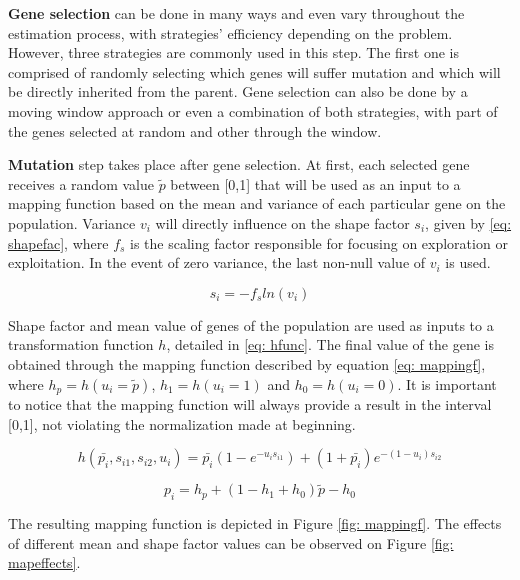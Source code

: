 \textbf{Gene selection} can be done in many ways and even vary throughout the estimation process, with strategies' efficiency depending on the problem. However, three strategies are commonly used in this step. The first one is comprised of randomly selecting which genes will suffer mutation and which will be directly inherited from the parent. Gene selection can also be done by a moving window approach or even a combination of both strategies, with part of the genes selected at random and other through the window.

\textbf{Mutation} step takes place after gene selection. At first, each selected gene receives a random value $\tilde{p}$ between [0,1] that will be used as an input to a mapping function based on the mean and variance of each particular gene on the population. Variance $v_{i}$ will directly influence on the shape factor $s_{i}$,  given by \eqref{eq: shapefac}, where $f_{s}$ is the scaling factor responsible for focusing on exploration or exploitation. In the event of zero variance, the last non-null value of $v_{i}$ is used.

\begin{equation}
	s_{i} = -f_{s}ln(v_{i})
	\label{eq: shapefac}
\end{equation}

Shape factor and mean value of genes of the population are used as inputs to a transformation function $h$, detailed in \eqref{eq: hfunc}. The final value of the gene is obtained through the mapping function described by equation \eqref{eq: mappingf}, where $h_{p} = h(u_{i} = \tilde{p})$, $h_{1} = h(u_{i} = 1)$ and $h_{0} = h(u_{i} = 0)$. It is important to notice that the mapping function will always provide a result in the interval [0,1], not violating the normalization made at beginning.

\begin{equation}
	h(\bar{p_{i}}, s_{i1}, s_{i2}, u_{i}) = \bar{p_{i}}(1 - e^{-u_{i}s_{i1}}) + (1 + \bar{p_{i}})e^{-(1 - u_{i})s_{i2}}
	\label{eq: hfunc}
\end{equation}

\begin{equation}
	p_{i} = h_{p} + (1 - h_{1} + h_{0})\tilde{p} - h_{0}
	\label{eq: mappingf}
\end{equation}

The resulting mapping function is depicted in Figure \ref{fig: mappingf}. The effects of different mean and shape factor values can be observed on Figure \ref{fig: mapeffects}.

